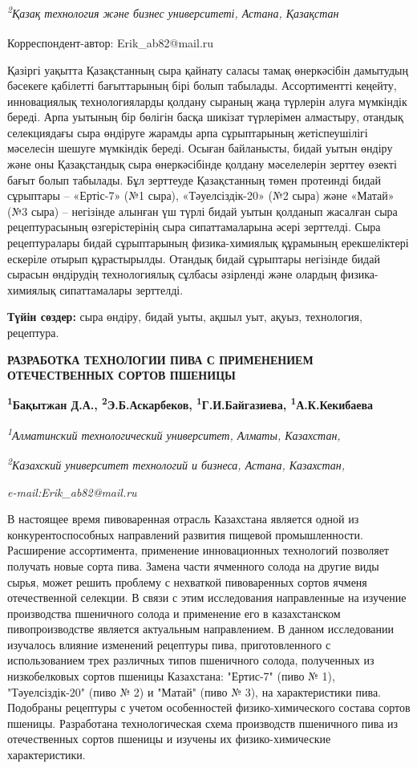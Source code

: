\emph{\textsuperscript{2}Қазақ технология және бизнес университеті,
Астана, Қазақстан}

{\bfseries \textsuperscript{\envelope }}Корреспондент-автор: Erik\_ab82@mail.ru

\hl{}

Қазіргі уақытта Қазақстанның сыра қайнату саласы тамақ өнеркәсібін
дамытудың бәсекеге қабілетті бағыттарының бірі болып табылады.
Ассортиментті кеңейту, инновациялық технологияларды қолдану сыраның жаңа
түрлерін алуға мүмкіндік береді. Арпа уытының бір бөлігін басқа шикізат
түрлерімен алмастыру, отандық селекциядағы сыра өндіруге жарамды арпа
сұрыптарының жетіспеушілігі мәселесін шешуге мүмкіндік береді. Осыған
байланысты, бидай уытын өндіру және оны Қазақстандық сыра өнеркәсібінде
қолдану мәселелерін зерттеу өзекті бағыт болып табылады. Бұл зерттеуде
Қазақстанның төмен протеинді бидай сұрыптары -- «Ертіс-7» (№1 сыра),
«Тәуелсіздік-20» (№2 сыра) және «Матай» (№3 сыра) -- негізінде алынған
үш түрлі бидай уытын қолданып жасалған сыра рецептурасының
өзгерістерінің сыра сипаттамаларына әсері зерттелді. Сыра рецептуралары
бидай сұрыптарының физика-химиялық құрамының ерекшеліктері ескеріле
отырып құрастырылды. Отандық бидай сұрыптары негізінде бидай сырасын
өндірудің технологиялық сұлбасы әзірленді және олардың физика-химиялық
сипаттамалары зерттелді.

{\bfseries Түйін сөздер:} сыра өндіру, бидай уыты, ақшыл уыт, ақуыз,
технология, рецептура.

\hl{}

{\bfseries РАЗРАБОТКА ТЕХНОЛОГИИ ПИВА С ПРИМЕНЕНИЕМ ОТЕЧЕСТВЕННЫХ СОРТОВ
ПШЕНИЦЫ}

\hl{}

{\bfseries \textsuperscript{1}Бақытжан Д.А.,
\textsuperscript{2}Э.Б.Аскарбеков\textsuperscript{\envelope },
\textsuperscript{1}Г.И.Байгазиева, \textsuperscript{1}А.К.Кекибаева}

\emph{\textsuperscript{1}Алматинский технологический университет,
Алматы, Казахстан,}

\emph{\textsuperscript{2}Казахский университет технологий и бизнеса,
Астана, Казахстан,}

\emph{e-mail:Erik\_ab82@mail.ru}

В настоящее время пивоваренная отрасль Казахстана является одной из
конкурентоспособных направлений развития пищевой промышленности.
Расширение ассортимента, применение инновационных технологий позволяет
получать новые сорта пива. Замена части ячменного солода на другие виды
сырья, может решить проблему с нехваткой пивоваренных сортов ячменя
отечественной селекции. В связи с этим исследования направленные на
изучение производства пшеничного солода и применение его в казахстанском
пивопроизводстве является актуальным направлением. В данном исследовании
изучалось влияние изменений рецептуры пива, приготовленного с
использованием трех различных типов пшеничного солода, полученных из
низкобелковых сортов пшеницы Казахстана: "Ертис-7" (пиво № 1),
"Тәуелсіздік-20" (пиво № 2) и "Матай" (пиво № 3), на характеристики
пива. Подобраны рецептуры с учетом особенностей физико-химического
состава сортов пшеницы. Разработана технологическая схема производств
пшеничного пива из отечественных сортов пшеницы и изучены их
физико-химические характеристики.

